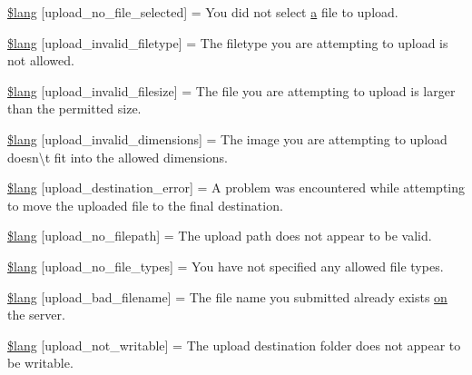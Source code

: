 \begin{DoxyCompactItemize}
\item 
\hyperlink{system_2language_2english_2upload__lang_8php_a88d8e8f9b879d1c25e6c089f3d3b5a30}{\$lang} \mbox{[}\textquotesingle{}upload\+\_\+no\+\_\+file\+\_\+selected\textquotesingle{}\mbox{]} = \textquotesingle{}You did not select \hyperlink{_admin_2assets_2js_2bootstrap_8min_8js_a1f5870dcf487187f13d5fd328ed9e6e7}{a} file to upload.\textquotesingle{}
\item 
\hyperlink{system_2language_2english_2upload__lang_8php_ac8631aa85ed80396bd78e91a76d5fd38}{\$lang} \mbox{[}\textquotesingle{}upload\+\_\+invalid\+\_\+filetype\textquotesingle{}\mbox{]} = \textquotesingle{}The filetype you are attempting to upload is not allowed.\textquotesingle{}
\item 
\hyperlink{system_2language_2english_2upload__lang_8php_a832b3ec1d84b1d48a488cf525954d8f2}{\$lang} \mbox{[}\textquotesingle{}upload\+\_\+invalid\+\_\+filesize\textquotesingle{}\mbox{]} = \textquotesingle{}The file you are attempting to upload is larger than the permitted size.\textquotesingle{}
\item 
\hyperlink{system_2language_2english_2upload__lang_8php_a4e796eeccf7df90acffea7884a5bd558}{\$lang} \mbox{[}\textquotesingle{}upload\+\_\+invalid\+\_\+dimensions\textquotesingle{}\mbox{]} = \textquotesingle{}The image you are attempting to upload doesn\textbackslash{}\textquotesingle{}t fit into the allowed dimensions.\textquotesingle{}
\item 
\hyperlink{system_2language_2english_2upload__lang_8php_a31be70c748b9bfc43dd7468e1fa64c42}{\$lang} \mbox{[}\textquotesingle{}upload\+\_\+destination\+\_\+error\textquotesingle{}\mbox{]} = \textquotesingle{}A problem was encountered while attempting to move the uploaded file to the final destination.\textquotesingle{}
\item 
\hyperlink{system_2language_2english_2upload__lang_8php_a3c17908c53072c6a5ef593760aaaa704}{\$lang} \mbox{[}\textquotesingle{}upload\+\_\+no\+\_\+filepath\textquotesingle{}\mbox{]} = \textquotesingle{}The upload path does not appear to be valid.\textquotesingle{}
\item 
\hyperlink{system_2language_2english_2upload__lang_8php_ab188c98e583c81905dedaad54ad452bb}{\$lang} \mbox{[}\textquotesingle{}upload\+\_\+no\+\_\+file\+\_\+types\textquotesingle{}\mbox{]} = \textquotesingle{}You have not specified any allowed file types.\textquotesingle{}
\item 
\hyperlink{system_2language_2english_2upload__lang_8php_abb379322384f3f35952a539c63e2c8f7}{\$lang} \mbox{[}\textquotesingle{}upload\+\_\+bad\+\_\+filename\textquotesingle{}\mbox{]} = \textquotesingle{}The file name you submitted already exists \hyperlink{how_to_play_8js_af1f111425a03a603c02a2abf44ad8c43}{on} the server.\textquotesingle{}
\item 
\hyperlink{system_2language_2english_2upload__lang_8php_aed6bfb5a9094179427f61fcbb582145b}{\$lang} \mbox{[}\textquotesingle{}upload\+\_\+not\+\_\+writable\textquotesingle{}\mbox{]} = \textquotesingle{}The upload destination folder does not appear to be writable.\textquotesingle{}
\end{DoxyCompactItemize}


